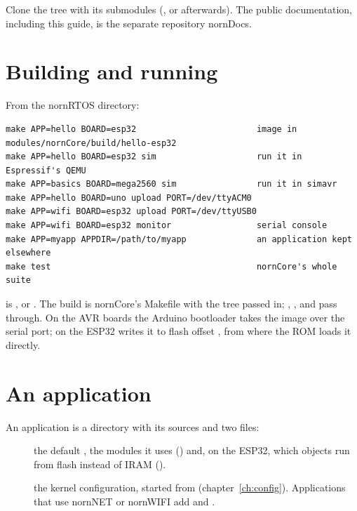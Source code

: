 Clone the tree with its submodules (, or
 afterwards). The public documentation, including this guide,
is the separate repository nornDocs.

\section{Building and running}

From the nornRTOS directory:

\begin{lstlisting}[language={}]
make APP=hello BOARD=esp32                        image in modules/nornCore/build/hello-esp32
make APP=hello BOARD=esp32 sim                    run it in Espressif's QEMU
make APP=basics BOARD=mega2560 sim                run it in simavr
make APP=hello BOARD=uno upload PORT=/dev/ttyACM0
make APP=wifi BOARD=esp32 upload PORT=/dev/ttyUSB0
make APP=wifi BOARD=esp32 monitor                 serial console
make APP=myapp APPDIR=/path/to/myapp              an application kept elsewhere
make test                                         nornCore's whole suite
\end{lstlisting}

 is ,  or . The build is nornCore's
Makefile with the tree passed in; , , 
and  pass through. On the AVR boards the Arduino bootloader takes the
image over the serial port; on the ESP32  writes it to flash offset
, from where the ROM loads it directly.

\section{An application}

An application is a directory with its sources and two files:

\begin{description}
\item[] the default , the modules it uses () and,
  on the ESP32, which objects run from flash instead of IRAM ().
\item[] the kernel configuration, started from
   (chapter~\ref{ch:config}). Applications that
  use nornNET or nornWIFI add  and .
\end{description}

